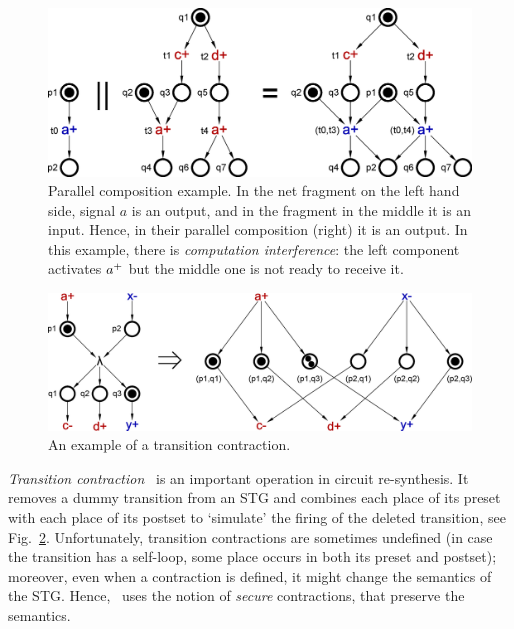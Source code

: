 \begin{figure}[t]
    \centering
    \includegraphics[scale=0.4]{EXPERIMENTS/stg/pcomp_example}
    \caption[Parallel composition example]{\label{fig_parcom}
        Parallel composition example. In the net fragment on the left hand side,
        signal $a$ is an output, and in the fragment in the middle it is an input.
        Hence, in their parallel composition (right) it is an output.
        In this example, there is \emph{computation interference}: the left component activates $a^+$ but the middle one is not ready to receive it.}
\end{figure}

\smallskip


\begin{figure}[!tb]
    \centering
    \includegraphics[scale=0.4]{EXPERIMENTS/stg/transition_contraction}
    \caption{\label{fig3.1}
        An example of a transition contraction.
    }
\end{figure}


\emph{Transition contraction}~\cite{vowo02lncs} is an important operation in circuit re-synthesis. It removes a dummy transition from an STG and
combines each place of its preset with each place of its postset to `simulate' the
firing of the deleted transition, see Fig.~\ref{fig3.1}. Unfortunately, transition contractions are sometimes undefined (\eg in case the transition has a self-loop, \ie some place occurs in both its preset and postset); moreover, even when a contraction is defined, it might change the semantics of the STG.
Hence,~\cite{vowo02lncs} uses the notion of \emph{secure} contractions, that preserve the semantics.


